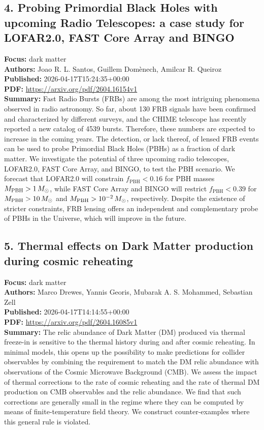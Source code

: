 \documentclass[11pt]{article}
\begin{document}
\subsection*{4. Probing Primordial Black Holes with upcoming Radio Telescopes: a case study for LOFAR2.0, FAST Core Array and BINGO}
\textbf{Focus:} dark matter\\
\textbf{Authors:} Joao R. L. Santos, Guillem Domènech, Amilcar R. Queiroz\\
\textbf{Published:} 2026-04-17T15:24:35+00:00\\
\textbf{PDF:} \href{https://arxiv.org/pdf/2604.16154v1}{https://arxiv.org/pdf/2604.16154v1}\\
\textbf{Summary:}
Fast Radio Bursts (FRBs) are among the most intriguing phenomena observed in radio astronomy. So far, about 130 FRB signals have been confirmed and characterized by different surveys, and the CHIME telescope has recently reported a new catalog of 4539 bursts. Therefore, these numbers are expected to increase in the coming years. The detection, or lack thereof, of lensed FRB events can be used to probe Primordial Black Holes (PBHs) as a fraction of dark matter. We investigate the potential of three upcoming radio telescopes, LOFAR2.0, FAST Core Array, and BINGO, to test the PBH scenario. We forecast that LOFAR2.0 will constrain $f_{\mathrm{PBH}} < 0.16$ for PBH masses $M_{\rm PBH}>1\,{M_{\odot}}$, while FAST Core Array and BINGO will restrict $f_{\mathrm{PBH}} < 0.39$ for $M_{\rm PBH}>10\,{M_{\odot}}$ and $M_{\rm PBH}>10^{-2}\,{M_{\odot}}$, respectively. Despite the existence of stricter constraints, FRB lensing offers an independent and complementary probe of PBHs in the Universe, which will improve in the future.
\newpage
\subsection*{5. Thermal effects on Dark Matter production during cosmic reheating}
\textbf{Focus:} dark matter\\
\textbf{Authors:} Marco Drewes, Yannis Georis, Mubarak A. S. Mohammed, Sebastian Zell\\
\textbf{Published:} 2026-04-17T14:14:55+00:00\\
\textbf{PDF:} \href{https://arxiv.org/pdf/2604.16085v1}{https://arxiv.org/pdf/2604.16085v1}\\
\textbf{Summary:}
The relic abundance of Dark Matter (DM) produced via thermal freeze-in is sensitive to the thermal history during and after cosmic reheating. In minimal models, this opens up the possibility to make predictions for collider observables by combining the requirement to match the DM relic abundance with observations of the Cosmic Microwave Background (CMB). We assess the impact of thermal corrections to the rate of cosmic reheating and the rate of thermal DM production on CMB observables and the relic abundance. We find that such corrections are generally small in the regime where they can be computed by means of finite-temperature field theory. We construct counter-examples where this general rule is violated.
\end{document}
